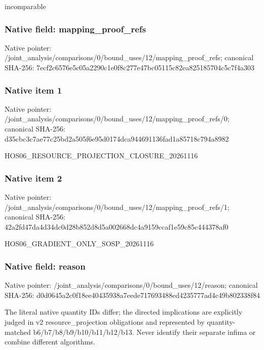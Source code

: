 \documentclass[10pt,a4paper]{article}
\begin{document}
\begingroup\raggedright\sloppy incomparable\par\endgroup

\subsubsection{Native field: mapping\_\allowbreak{}proof\_\allowbreak{}refs}
Native pointer: /joint\_\allowbreak{}analysis/comparisons/0/bound\_\allowbreak{}uses/12/mapping\_\allowbreak{}proof\_\allowbreak{}refs; canonical SHA-256: 7ecf2c6576e5c05a2290c1e0f8c277e47bc05115c82ea825185704c5c7f4a303

\subsubsection{Native item 1}
Native pointer: /joint\_\allowbreak{}analysis/comparisons/0/bound\_\allowbreak{}uses/12/mapping\_\allowbreak{}proof\_\allowbreak{}refs/0; canonical SHA-256: d35cbc3c7ae77c25bd2a505f6e95d0174dca944691136fad1a85718c794a8982

\begingroup\raggedright\sloppy HOS06\_\allowbreak{}RESOURCE\_\allowbreak{}PROJECTION\_\allowbreak{}CLOSURE\_\allowbreak{}20261116\par\endgroup

\subsubsection{Native item 2}
Native pointer: /joint\_\allowbreak{}analysis/comparisons/0/bound\_\allowbreak{}uses/12/mapping\_\allowbreak{}proof\_\allowbreak{}refs/1; canonical SHA-256: 42a2fd47da4d34dc0d28b852d8d5a002668dc4a9159ccaf1e59c85c444378af0

\begingroup\raggedright\sloppy HOS06\_\allowbreak{}GRADIENT\_\allowbreak{}ONLY\_\allowbreak{}SOSP\_\allowbreak{}20261116\par\endgroup

\subsubsection{Native field: reason}
Native pointer: /joint\_\allowbreak{}analysis/comparisons/0/bound\_\allowbreak{}uses/12/reason; canonical SHA-256: d0d0645a2c0f18ee40435938a7eede717693488ed4235777ad4c49b802338f84

\begingroup\raggedright\sloppy The literal native quantity IDs differ;\allowbreak{} the directed implications are explicitly judged in v2 resource\_\allowbreak{}projection obligations and represented by quantity-matched b6/\allowbreak{}b7/\allowbreak{}b8/\allowbreak{}b9/\allowbreak{}b10/\allowbreak{}b11/\allowbreak{}b12/\allowbreak{}b13. Never identify their separate infima or combine different algorithms.\par\endgroup
\end{document}
